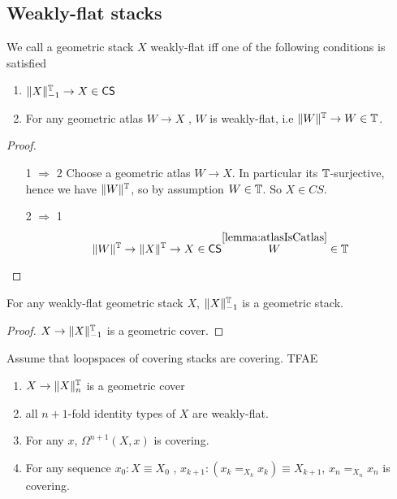\documentclass{article}
\newcommand{\CS}{\mathsf{CS}}
\begin{document}
\subsection{Weakly-flat stacks}
\begin{definition}
	We call a geometric stack $X$ weakly-flat iff one of the following conditions is satisfied
	\begin{enumerate}
		\item $\|X\|_{-1}^\bT \to X \in \CS$
		\item For any geometric atlas $W \to X$ , $W$ is weakly-flat, i.e $\|W\|^{\mathbb{T}} \to W \in \mathbb{T}$.
	\end{enumerate}

\end{definition}
\begin{proof}
	\ \begin{enumerate}
		\item [1 $\Rightarrow$ 2] Choose a geometric atlas $W \to X$. In particular its $\mathbb{T}$-surjective, hence we have $\|W\|^{\mathbb{T}}$, so by assumption $W \in \mathbb{T}$. So $X \in CS$.
		\item [2 $\Rightarrow$ 1] 
		\[\|W\|^\bT \to \|X\|^\bT \to X \in \CS \overset{\ref{lemma:atlasIsCatlas}} W \in \bT \]
	\end{enumerate}
\end{proof}
%
\begin{lemma}
For any weakly-flat geometric stack $X$, $\|X\|_{-1}^{\mathbb{T}}$ is a geometric stack.
\end{lemma}
\begin{proof}
	$X \to \|X\|_{-1}^{\mathbb{T}}$ is a geometric cover.
\end{proof}
\begin{prop}{\label{prop:EtaleTruncations}}
	Assume that loopspaces of covering stacks are covering. TFAE
	\begin{enumerate}
		\item $X \to \|X\|_n^{\mathbb{T}}$ is a geometric cover
		\item  all $n+1$-fold identity types of $X$ are weakly-flat.
	
		\item For any $x$, $\Omega^{n+1} (X , x)$ is covering.
			\item For any sequence $x_0 : X \equiv X_0$ , $x_{k+1} : (x_{k} =_{X_k} x_k) \equiv X_{k+1}$, $x_n =_{X_n} x_n$ is covering.
	\end{enumerate}

\end{prop}
\end{document}
